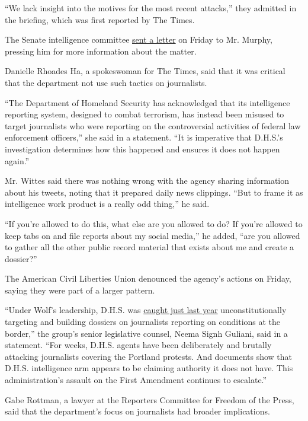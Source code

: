 ``We lack insight into the motives for the most recent attacks,'' they
admitted in the briefing, which was first reported by The Times.

The Senate intelligence committee
\href{https://www.warner.senate.gov/public/_cache/files/e/a/eaa5a194-d357-475b-a880-f7aae8437437/204A4D77A82B5684AF04EACAB1D37719.2020-07-31-intelligence-to-ia-murphy-letter.pdf}{sent
a letter} on Friday to Mr. Murphy, pressing him for more information
about the matter.

Danielle Rhoades Ha, a spokeswoman for The Times, said that it was
critical that the department not use such tactics on journalists.

``The Department of Homeland Security has acknowledged that its
intelligence reporting system, designed to combat terrorism, has instead
been misused to target journalists who were reporting on the
controversial activities of federal law enforcement officers,'' she said
in a statement. ``It is imperative that D.H.S.'s investigation
determines how this happened and ensures it does not happen again.''

Mr. Wittes said there was nothing wrong with the agency sharing
information about his tweets, noting that it prepared daily news
clippings. ``But to frame it as intelligence work product is a really
odd thing,'' he said.

``If you're allowed to do this, what else are you allowed to do? If
you're allowed to keep tabs on and file reports about my social media,''
he added, ``are you allowed to gather all the other public record
material that exists about me and create a dossier?''

The American Civil Liberties Union denounced the agency's actions on
Friday, saying they were part of a larger pattern.

``Under Wolf's leadership, D.H.S. was
\href{https://www.aclu.org/blog/free-speech/freedom-press/government-detaining-and-interrogating-journalists-and-advocates-us}{caught
just last year} unconstitutionally targeting and building dossiers on
journalists reporting on conditions at the border,'' the group's senior
legislative counsel, Neema Signh Guliani, said in a statement. ``For
weeks, D.H.S. agents have been deliberately and brutally attacking
journalists covering the Portland protests. And documents show that
D.H.S. intelligence arm appears to be claiming authority it does not
have. This administration's assault on the First Amendment continues to
escalate.''

Gabe Rottman, a lawyer at the Reporters Committee for Freedom of the
Press, said that the department's focus on journalists had broader
implications.

